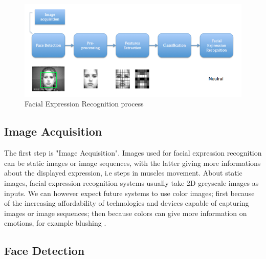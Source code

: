 \begin{figure}[!h]
\begin{center}
\noindent \includegraphics[scale=0.6]{figures/facial_expression_recognition_process} 
\newline
\caption{Facial Expression Recognition process}
\label{facial_expression_recognition_process}
\end{center} 
\end{figure}

\subsection{Image Acquisition}

\vspace{\baselineskip}
\noindent The first step is "Image Acquisition". Images used for facial expression recognition can be static images or image sequences, with the latter giving more informations about the displayed expression, i.e steps in muscles movement. About static images, facial expression recognition systems usually take 2D greyscale images as inputs. We can however expect future systems to use color images; first because of the increasing affordability of technologies and devices capable of capturing images or image sequences; then because colors can give more information on emotions, for example blushing \cite{CHI03}.
\newline

\subsection{Face Detection}

